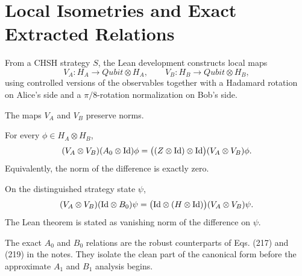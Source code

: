 \section{Local Isometries and Exact Extracted Relations}

\begin{definition}
\label{def:local-isometries}
From a CHSH strategy $S$, the Lean development constructs local maps
\[
V_A : H_A \to Qubit \otimes H_A,
\qquad
V_B : H_B \to Qubit \otimes H_B,
\]
using controlled versions of the observables together with a Hadamard rotation on Alice's side and a $\pi/8$-rotation normalization on Bob's side.
\end{definition}

\begin{theorem}
\label{thm:va-vb-isometries}
The maps $V_A$ and $V_B$ preserve norms.
\end{theorem}

\begin{theorem}
\label{thm:a0-exact}
For every $\phi \in H_A \otimes H_B$,
\[
(V_A \otimes V_B)(A_0 \otimes \mathrm{Id})\phi
=
\bigl((Z \otimes \mathrm{Id})\otimes \mathrm{Id} \bigr)(V_A \otimes V_B)\phi.
\]
Equivalently, the norm of the difference is exactly zero.
\end{theorem}

\begin{theorem}
\label{thm:b0-exact}
On the distinguished strategy state $\psi$,
\[
(V_A \otimes V_B)(\mathrm{Id} \otimes B_0)\psi
=
\bigl(\mathrm{Id} \otimes (H \otimes \mathrm{Id})\bigr)(V_A \otimes V_B)\psi.
\]
The Lean theorem is stated as vanishing norm of the difference on $\psi$.
\end{theorem}

\begin{remark}
The exact $A_0$ and $B_0$ relations are the robust counterparts of Eqs. (217) and (219) in the notes.
They isolate the clean part of the canonical form before the approximate $A_1$ and $B_1$ analysis begins.
\end{remark}
